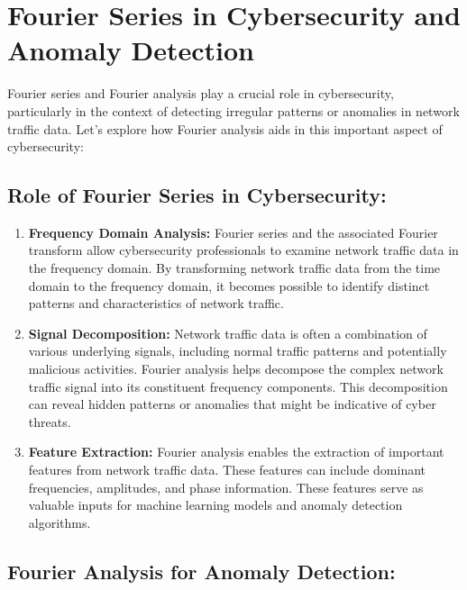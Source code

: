 \documentclass[11pt]{article}
\begin{document}
    \hypertarget{fourier-series-in-cybersecurity-and-anomaly-detection}{%
\section{Fourier Series in Cybersecurity and Anomaly
Detection}\label{fourier-series-in-cybersecurity-and-anomaly-detection}}

Fourier series and Fourier analysis play a crucial role in
cybersecurity, particularly in the context of detecting irregular
patterns or anomalies in network traffic data. Let's explore how Fourier
analysis aids in this important aspect of cybersecurity:

\hypertarget{role-of-fourier-series-in-cybersecurity}{%
\subsection{Role of Fourier Series in
Cybersecurity:}\label{role-of-fourier-series-in-cybersecurity}}

\begin{enumerate}
\def\labelenumi{\arabic{enumi}.}
\item
  \textbf{Frequency Domain Analysis:} Fourier series and the associated
  Fourier transform allow cybersecurity professionals to examine network
  traffic data in the frequency domain. By transforming network traffic
  data from the time domain to the frequency domain, it becomes possible
  to identify distinct patterns and characteristics of network traffic.
\item
  \textbf{Signal Decomposition:} Network traffic data is often a
  combination of various underlying signals, including normal traffic
  patterns and potentially malicious activities. Fourier analysis helps
  decompose the complex network traffic signal into its constituent
  frequency components. This decomposition can reveal hidden patterns or
  anomalies that might be indicative of cyber threats.
\item
  \textbf{Feature Extraction:} Fourier analysis enables the extraction
  of important features from network traffic data. These features can
  include dominant frequencies, amplitudes, and phase information. These
  features serve as valuable inputs for machine learning models and
  anomaly detection algorithms.
\end{enumerate}

\hypertarget{fourier-analysis-for-anomaly-detection}{%
\subsection{Fourier Analysis for Anomaly
Detection:}\label{fourier-analysis-for-anomaly-detection}}
\end{document}
